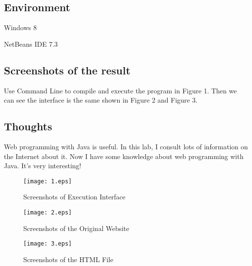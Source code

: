 \documentclass{article}
\begin{document}
\subsection{Environment}
\begin{compactitem}
\item Windows 8
\item NetBeans IDE 7.3
\end{compactitem}

\subsection{Screenshots of the result}
Use Command Line to compile and execute the program in Figure 1. Then we can see the interface is the same shown in Figure 2 and Figure 3.

\subsection{Thoughts}
Web programming with Java is useful. In this lab, I consult lots of information on the Internet about it. Now I have some knowledge about web programming with Java. It's very interesting!

\begin{figure}[h]
\centering
\texttt{[image: 1.eps]}
\caption{Screenshots of Execution Interface}
\end{figure}
\begin{figure}[h]
\centering
\texttt{[image: 2.eps]}
\caption{Screenshots of the Original Website}
\end{figure}
\begin{figure}[h]
\centering
\texttt{[image: 3.eps]}
\caption{Screenshots of the HTML File}
\end{figure}
\end{document}
